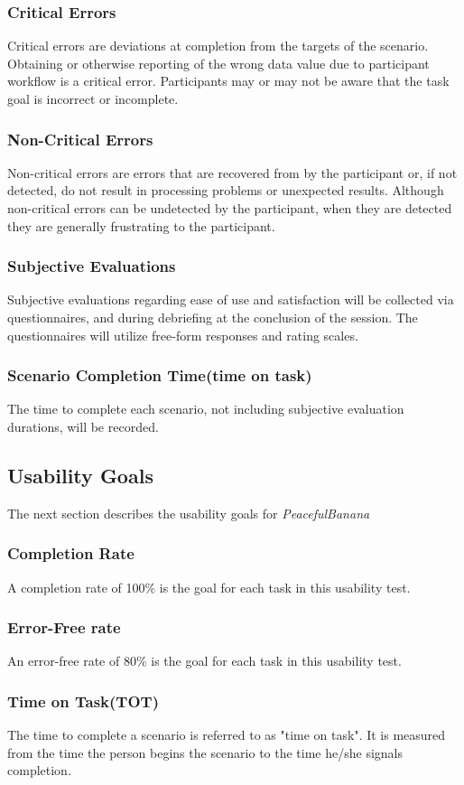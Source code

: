 \subsubsection{Critical Errors}
Critical errors are deviations at completion from the targets of the scenario. Obtaining or otherwise reporting of the wrong data value due to participant workflow is a critical error. Participants may or may not be aware that the task goal is incorrect or incomplete.
\subsubsection{Non-Critical Errors}
Non-critical errors are errors that are recovered from by the participant or, if not detected, do not result in processing problems or unexpected results. Although non-critical errors can be undetected by the participant, when they are detected they are generally frustrating to the participant.
\subsubsection{Subjective Evaluations}
Subjective evaluations regarding ease of use and satisfaction will be collected via questionnaires, and during debriefing at the conclusion of the session. The questionnaires will utilize free-form responses and rating scales.
\subsubsection{Scenario Completion Time(time on task)}
The time to complete each scenario, not including subjective evaluation durations, will be recorded.

\subsection{Usability Goals}
The next section describes the usability goals for \emph{PeacefulBanana}
\subsubsection{Completion Rate}
A completion rate of 100\% is the goal for each task in this usability test.
\subsubsection{Error-Free rate}
An error-free rate of 80\% is the goal for each task in this usability test.
\subsubsection{Time on Task(TOT)}
The time to complete a scenario is referred to as "time on task". It is measured from the time the person begins the scenario to the time he/she signals completion.
